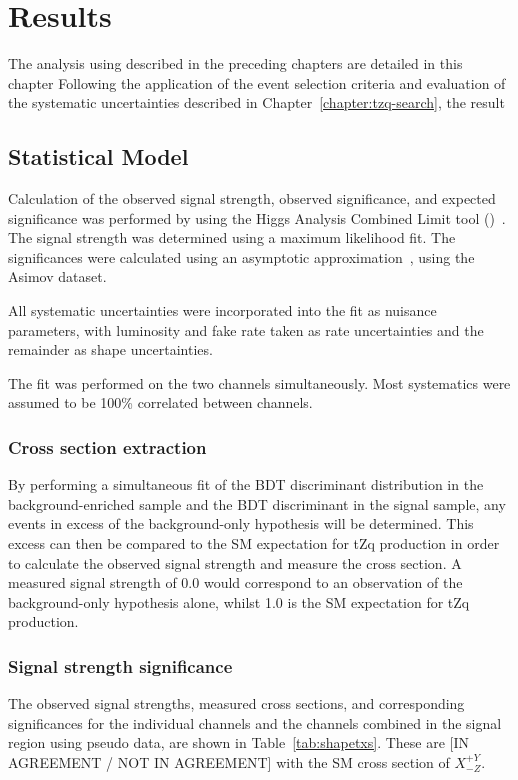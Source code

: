 \chapter{Results}\label{chapter:results}
The analysis using described in the preceding chapters are detailed in this chapter
Following the application of the event selection criteria and evaluation of the systematic uncertainties described in Chapter~\ref{chapter:tzq-search}, the result 

\section{Statistical Model}
Calculation of the observed signal strength, observed significance, and
expected significance was performed by using the Higgs Analysis Combined Limit
tool (\combine{})~\cite{Combine}. The signal strength was determined using a
maximum likelihood fit.  The significances were calculated using an asymptotic
approximation~\cite{AsymptoticFormulae}, using the Asimov dataset.

All systematic uncertainties were incorporated into the fit as nuisance
parameters, with luminosity and fake rate taken as rate uncertainties and the
remainder as shape uncertainties.
 
The fit was performed on the two channels simultaneously. Most systematics were
assumed to be 100\% correlated between channels.

\subsection{Cross section extraction}
 
By performing a simultaneous fit of the BDT discriminant distribution in the
background-enriched sample and the BDT discriminant in the signal sample, any
events in excess of the background-only hypothesis will be determined. This
excess can then be compared to the SM expectation for tZq production in order
to calculate the observed signal strength and measure the cross section. A
measured signal strength of 0.0 would correspond to an observation of the
background-only hypothesis alone, whilst 1.0 is the SM expectation for tZq
production.

\subsection{Signal strength significance}

The observed signal strengths, measured cross sections, and corresponding
significances for the individual channels and the channels combined in the
signal region using pseudo data, are shown in Table~\ref{tab:shapetxs}. These
are [IN AGREEMENT / NOT IN AGREEMENT] with the SM cross section of
$X^{+Y}_{-Z}$.
 
